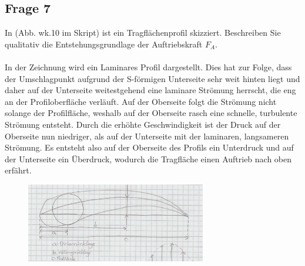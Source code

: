 \documentclass[a4paper,10pt]{scrartcl}
\begin{document}
		\subsection{Frage 7}
			In (Abb. wk.10 im Skript) ist ein Tragflächenprofil skizziert. Beschreiben Sie qualitativ die Entstehungsgrundlage
			der Auftriebskraft \(F_{A}\).\\
			\\
			In der Zeichnung wird ein Laminares Profil dargestellt. Dies hat zur Folge, dass der Umschlagpunkt aufgrund der S-förmigen Unterseite sehr weit hinten liegt und daher auf der Unterseite weitestgehend eine laminare Strömung herrscht, die eng an der Profiloberfläche verläuft. Auf der Oberseite folgt die Strömung nicht solange der Profilfläche, weshalb auf der Oberseite rasch eine schnelle, turbulente Strömung entsteht. Durch die erhöhte Geschwindigkeit ist der Druck auf der Oberseite nun niedriger, als auf der Unterseite mit der laminaren, langsameren Strömung. Es entsteht also auf der Oberseite des Profils ein Unterdruck und auf der Unterseite ein Überdruck, wodurch die Tragfläche einen Auftrieb nach oben erfährt.
			\FloatBarrier
\begin{figure}[h]		
		\centering
\includegraphics[width=0.7\textwidth]{./Bilder/wk1}

\end{figure}
\FloatBarrier
	
\end{document}
